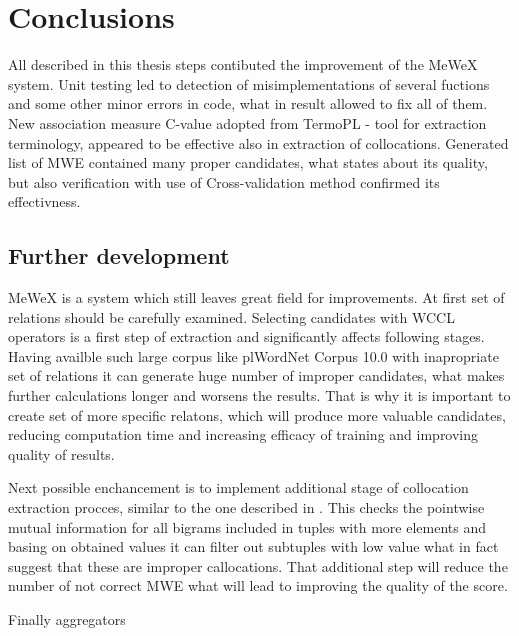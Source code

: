 \chapter{Conclusions}

All described in this thesis steps contibuted the improvement of the MeWeX system. Unit testing led to detection of 
misimplementations of several fuctions and some other minor errors in code, what in result allowed to fix all of them. 
New association measure C-value adopted from TermoPL \cite{termopl} - tool for extraction terminology, appeared to be effective also in extraction of collocations. 
Generated list of MWE contained many proper candidates, what states about its quality, but also verification with use of Cross-validation 
method confirmed its effectivness.

\section{Further development}
MeWeX is a system which still leaves great field for improvements. At first set of relations should be carefully examined. 
Selecting candidates with WCCL operators is a first step of extraction and significantly affects following stages. 
Having availble such large corpus like plWordNet Corpus 10.0 with inapropriate set of relations it can generate huge number of improper candidates, 
what makes further calculations longer and worsens the results. That is why it is important to create set of more specific relatons, 
which will produce more valuable candidates, reducing computation time and increasing efficacy of training and improving quality of results.

Next possible enchancement is to implement additional stage of collocation extraction procces, similar to the one described in \cite{termopl}.
This checks the pointwise mutual information for all bigrams included in tuples with more elements and basing on obtained values it can 
filter out subtuples with low value what in fact suggest that these are improper callocations. That additional step will reduce the number of 
not correct MWE what will lead to improving the quality of the score.

Finally aggregators





